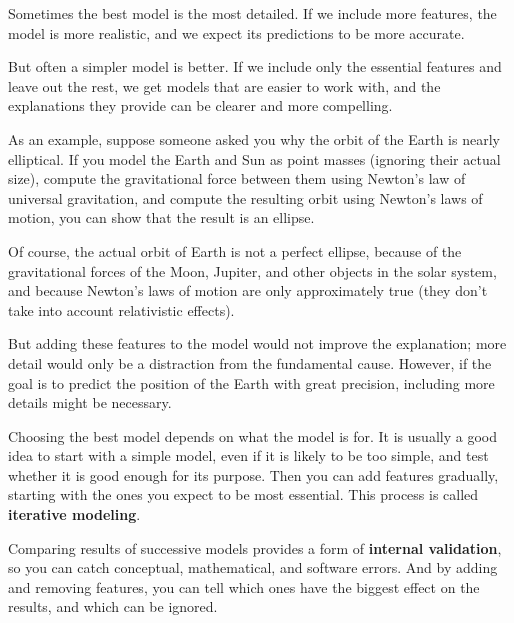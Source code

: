 \documentclass[main.tex]{subfiles}
\begin{document}

Sometimes the best model is the most detailed.  If we include more features, the model is more realistic, and we expect its predictions to be more accurate.


But often a simpler model is better.  If we include only the essential features and leave out the rest, we get models that are easier to work with, and the explanations they provide can be clearer and more compelling.


As an example, suppose someone asked you why the orbit of the Earth is nearly elliptical.  If you model the Earth and Sun as point masses (ignoring their actual size), compute the gravitational force between them using Newton's law of universal gravitation, and compute the resulting orbit using Newton's laws of motion, you can show that the result is an ellipse.


Of course, the actual orbit of Earth is not a perfect ellipse, because of the gravitational forces of the Moon, Jupiter, and other objects in the solar system, and because Newton's laws of motion are only approximately true (they don't take into account relativistic effects).


But adding these features to the model would not improve the explanation; more detail would only be a distraction from the fundamental cause.  However, if the goal is to predict the position of the Earth with great precision, including more details might be necessary.  

Choosing the best model depends on what the model is for.  It is usually a good idea to start with a simple model, even if it is likely to be too simple, and test whether it is good enough for its purpose.  Then you can add features gradually, starting with the ones you expect to be most essential.  This process is called {\bf iterative modeling}.


Comparing results of successive models provides a form of {\bf internal validation}, so you can catch conceptual, mathematical, and software errors.  And by adding and removing features, you can tell which ones have the biggest effect on the results, and which can be ignored.
\end{document}

